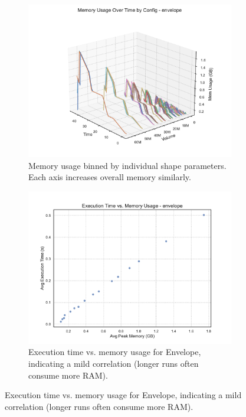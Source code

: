 \begin{figure}[htbp]
    \centering
    \begin{subfigure}[t]{0.49\textwidth}
        \centering
        \includegraphics[width=\textwidth]{assets/images/05/memory_usage_by_configuration_envelope}
        \caption{Memory usage binned by individual shape parameters. Each axis increases overall memory similarly.}
    \end{subfigure}
    \hfill
    \begin{subfigure}[t]{0.49\textwidth}
        \centering
        \includegraphics[width=\textwidth]{assets/images/05/execution_time_vs_memory_envelope}
        \caption{Execution time vs. memory usage for Envelope, indicating a mild correlation (longer runs often consume more \ac{RAM}).
}
\end{subfigure}
\end{figure}

